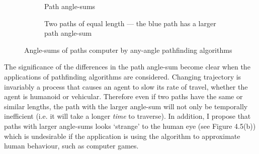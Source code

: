 \documentclass[12pt,notitlepage]{report}
\begin{document}
\begin{figure}
\centering
  \begin{subfigure}[b]{0.49\textwidth}
  \centering
  
  \caption{Path angle-sums}
  \end{subfigure}
  \begin{subfigure}[b]{0.49\textwidth}
  \centering
  \caption{Two paths of equal length --- the blue path has a larger path angle-sum}
  \end{subfigure}
\caption{Angle-sums of paths computer by any-angle pathfinding algorithms}
\end{figure}

\noindent
The significance of the differences in the path angle-sum become clear when the applications of pathfinding algorithms are considered. Changing trajectory is invariably a process that causes an agent to slow its rate of travel, whether the agent is humanoid or vehicular. Therefore even if two paths have the same or similar lengths, the path with the larger angle-sum will not only be temporally inefficient (i.e. it will take a longer {\em time} to traverse). In addition, I propose that paths with larger angle-sums looks `strange' to the human eye (see Figure 4.5(b)) which is undesirable if the application is using the algorithm to approximate human behaviour, such as computer games.\\
\end{document}

